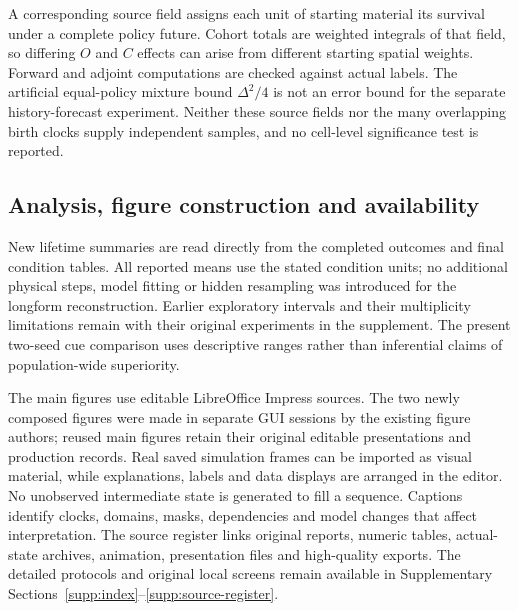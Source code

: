 A corresponding source field assigns each unit of starting material its survival under a complete policy future. Cohort totals are weighted integrals of that field, so differing $O$ and $C$ effects can arise from different starting spatial weights. Forward and adjoint computations are checked against actual labels. The artificial equal-policy mixture bound $\Delta^2/4$ is not an error bound for the separate history-forecast experiment. Neither these source fields nor the many overlapping birth clocks supply independent samples, and no cell-level significance test is reported.

\subsection*{Analysis, figure construction and availability}

New lifetime summaries are read directly from the completed outcomes and final condition tables. All reported means use the stated condition units; no additional physical steps, model fitting or hidden resampling was introduced for the longform reconstruction. Earlier exploratory intervals and their multiplicity limitations remain with their original experiments in the supplement. The present two-seed cue comparison uses descriptive ranges rather than inferential claims of population-wide superiority.

The main figures use editable LibreOffice Impress sources. The two newly composed figures were made in separate GUI sessions by the existing figure authors; reused main figures retain their original editable presentations and production records. Real saved simulation frames can be imported as visual material, while explanations, labels and data displays are arranged in the editor. No unobserved intermediate state is generated to fill a sequence. Captions identify clocks, domains, masks, dependencies and model changes that affect interpretation. The source register links original reports, numeric tables, actual-state archives, animation, presentation files and high-quality exports. The detailed protocols and original local screens remain available in Supplementary Sections~\ref{supp:index}--\ref{supp:source-register}.

